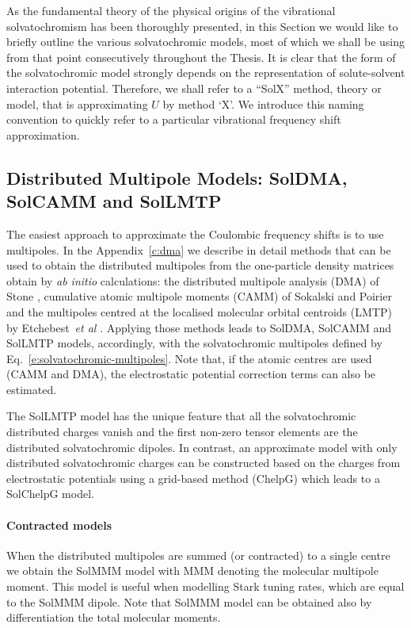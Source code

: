 \documentclass[b5paper,oneside,fleqn,11pt]{book}
\begin{document}
\begin{refsection}
As the fundamental theory of the physical origins of the vibrational
solvatochromism has been thoroughly presented, 
in this Section we would like to briefly outline
the various solvatochromic models, most of which 
we shall be using from that point 
consecutively throughout the Thesis. It is clear
that the form of the solvatochromic model strongly depends
on the representation of solute\hyp{}solvent interaction potential.
Therefore, we shall refer to
a ``SolX'' method, theory or model, that is approximating $U$
by method `X'. We introduce this naming convention to quickly refer to a
particular vibrational frequency shift approximation. 


\subsection{Distributed Multipole Models: SolDMA, SolCAMM and SolLMTP\label{s:solx-electrost}}

The easiest approach to approximate the Coulombic frequency shifts
is to use multipoles. In the Appendix~\ref{c:dma}
we describe in detail methods that can be used to obtain
the distributed multipoles from the one\hyp{}particle density matrices
obtain by \emph{ab initio} calculations: the distributed multipole analysis (DMA) of
Stone \citep{Stone.JCTC.2005}, cumulative atomic multipole moments (CAMM)
of Sokalski and Poirier \citep{Sokalski.Poirier.CPL.1983}
and the multipoles centred at the localised molecular orbital centroids (LMTP)
by Etchebest~\emph{et al} \citep{Etchebest.Lavery.Pullman.TheorChimActa.1982}.
Applying those methods leads to SolDMA, SolCAMM and SolLMTP models, accordingly, with the 
solvatochromic multipoles defined by Eq.~\eqref{e:solvatochromic-multipoles}. 
Note that, if the atomic centres are used (CAMM and DMA), the electrostatic potential
correction terms can also be estimated.

The SolLMTP model has the unique feature that all the solvatochromic 
distributed charges vanish and the first non\hyp{}zero tensor elements
are the distributed solvatochromic dipoles. In contrast, an approximate model 
with only distributed solvatochromic charges can be constructed based on the
charges from electrostatic potentials using a grid\hyp{}based 
method \citep{Breneman.Wiberg.JCC.1990} (ChelpG)
which leads to a SolChelpG model.
%
\paragraph{Contracted models\label{p:solx-electrost-contracted}}
When the distributed multipoles are summed (or contracted)
to a single centre we obtain the SolMMM model with MMM denoting 
the molecular multipole moment. This model is useful when
modelling Stark tuning rates, which are equal to
the SolMMM dipole. Note that SolMMM model can be obtained
also by differentiation the total molecular moments.


\end{refsection}
\end{document}
